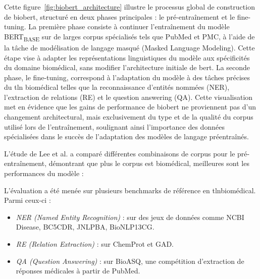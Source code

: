 \documentclass[12pt]{report}
\begin{document}
Cette figure~\ref{fig:biobert_architecture} illustre le processus global de construction de \gls{biobert}, structuré en deux phases principales : le pré-entraînement et le fine-tuning. La première phase consiste à continuer l’entraînement du modèle BERT\textsubscript{BASE} sur de larges corpus spécialisés tels que PubMed et PMC, à l’aide de la tâche de modélisation de langage masqué (Masked Language Modeling). Cette étape vise à adapter les représentations linguistiques du modèle aux spécificités du domaine biomédical, sans modifier l’architecture initiale de \gls{bert}. La seconde phase, le fine-tuning, correspond à l’adaptation du modèle à des tâches précises du \gls{tln} biomédical telles que la reconnaissance d’entités nommées (NER), l’extraction de relations (RE) et le question answering (QA). Cette visualisation met en évidence que les gains de performance de \gls{biobert} ne proviennent pas d’un changement architectural, mais exclusivement du type et de la qualité du corpus utilisé lors de l’entraînement, soulignant ainsi l’importance des données spécialisées dans le succès de l’adaptation des modèles de langage préentraînés.

L'étude de Lee et al. a comparé différentes combinaisons de corpus pour le pré-entraînement, démontrant que plus le corpus est biomédical, meilleures sont les performances du modèle :

\begin{table}[H]
\centering
\caption{Pré-entraînement de BioBERT selon les corpus textuels utilisés~\cite{lee2020biobert}}
\scriptsize
{}
\end{table}

L’évaluation a été menée sur plusieurs benchmarks de référence en \gls{tln}biomédical. Parmi ceux-ci :
\begin{itemize}
    \item \textit{NER (Named Entity Recognition)} : sur des jeux de données comme NCBI Disease, BC5CDR, JNLPBA, BioNLP13CG.
    \item \textit{RE (Relation Extraction)} : sur ChemProt et GAD.
    \item \textit{QA (Question Answering)} : sur BioASQ, une compétition d'extraction de réponses médicales à partir de PubMed.
\end{itemize}
\end{document}
